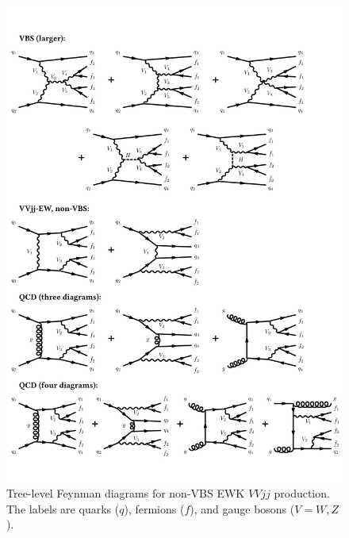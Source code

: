 \begin{figure}[htbp]
  \centering
  \includegraphics[width=.54\textwidth]{figs/ssww_13tev/diagrams/NoVbsEW}
  \caption{Tree-level Feynman diagrams for non-VBS EWK $VVjj$ production.  The labels are quarks ($q$), fermions ($f$), and gauge bosons ($V = W,Z$).}
  \label{fig:ssww13tev_diagrams_ewk}
\end{figure}

